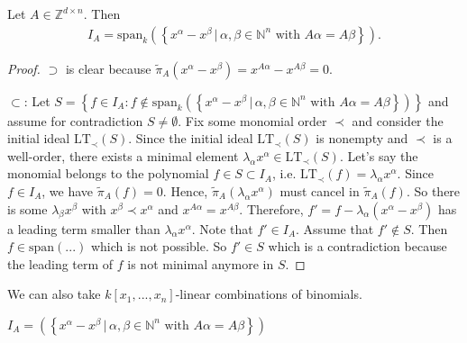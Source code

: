 \documentclass[a4paper, 11pt]{article}
\begin{document}
\begin{mdframed}
\begin{prop}
  Let \( A \in \mathbb Z^{d \times n} \). Then 
  \begin{align*}
    I_A = \mathrm{span}_k\left( \left\{ 
      x^\alpha - x^\beta \, | \, \alpha, \beta \in \mathbb N^n \text{ with } A\alpha = A\beta
     \right\} \right).
  \end{align*}
\end{prop}
\end{mdframed}

\begin{proof}
  \( \supset \) is clear because \( \tilde \pi_A(x^\alpha - x^\beta) = x^{A\alpha} - x^{A\beta}=0 \).

  \( \subset \): Let \( S = \left\{ f \in I_A : f \notin
  \mathrm{span}_k\left( \left\{ 
      x^\alpha - x^\beta \, | \, \alpha, \beta \in \mathbb N^n \text{ with } A\alpha = A\beta
     \right\} \right)
  \right\} \) and assume for contradiction \( S \neq \emptyset \). Fix some monomial order \( \prec \) and consider the initial ideal \( \mathrm{LT}_\prec(S) \). Since the initial ideal \( \mathrm{LT}_\prec(S) \) is nonempty and \( \prec \) is a well-order, there exists a minimal element \( \lambda_\alpha x^\alpha \in \mathrm{LT}_\prec(S) \). Let's say the monomial belongs to the polynomial \( f \in S \subset I_A \), i.e. \( \mathrm{LT}_\prec(f) = \lambda_\alpha x^\alpha \). Since \( f \in I_A\), we have \( \tilde \pi_A(f) = 0 \). Hence, \( \tilde \pi_A(\lambda_\alpha x^\alpha) \) must cancel in \(  \tilde \pi_A(f) \). So there is some \( \lambda_\beta x^\beta \) with \( x^\beta \prec x^\alpha \) and \( x^{A\alpha} = x^{A\beta} \). Therefore, \( f' = f - \lambda_\alpha(x^\alpha - x^\beta) \) has a leading term smaller than \( \lambda_\alpha x^\alpha \). Note that \( f' \in I_A \). Assume that \( f' \notin S \). Then \( f \in \mathrm{span}(...) \) which is not possible. So \( f' \in S \) which is a contradiction because the leading term of \( f \) is not minimal anymore in \( S \).
\end{proof}

We can also take \( k[x_1,...,x_n] \)-linear combinations of binomials.

\begin{mdframed}
\begin{cor}
  \(  I_A = \left( 
    \left\{ 
      x^\alpha - x^\beta \, | \, \alpha, \beta \in \mathbb N^n \text{ with } A\alpha = A\beta
     \right\}
   \right) \)
\end{cor}
\end{mdframed}
\end{document}
